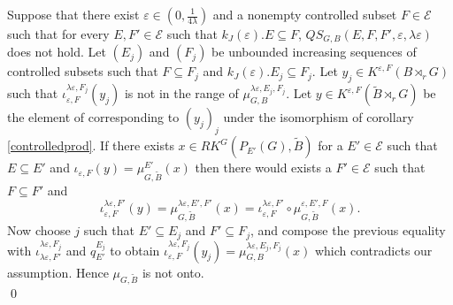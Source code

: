 \begin{dem}
Suppose that there exist $\varepsilon \in (0,\frac{1}{4\lambda})$ and a nonempty controlled subset $F\in\mathcal E$ such that for every $E,F'\in\mathcal E$ such that $k_J(\varepsilon). E \subseteq F$, $QS_{G,B}(E,F,F',\varepsilon,\lambda\varepsilon)$ does not hold. Let $(E_j)$ and $(F_j)$ be unbounded increasing sequences of controlled subsets such that $F\subseteq F_j$ and $k_J(\varepsilon).E_j\subseteq F_j$. Let $y_j\in K^{\varepsilon,F}(B\rtimes_r G)$ such that $\iota_{\varepsilon,F}^{\lambda\varepsilon,F_j}(y_j)$ is not in the range of $\mu_{G,B}^{\lambda\varepsilon, E_j , F_j}$. Let $y\in K^{\varepsilon,F}(\tilde B\rtimes_r G)$ be the element of corresponding to $(y_j)_j$ under the isomorphism of corollary \ref{controlledprod}. If there exists $x\in RK^G(P_{E'}(G),\tilde B)$ for a $E'\in\mathcal E$ such that $E\subseteq E'$ and $\iota_{\varepsilon,F}( y) =\mu_{G,\tilde B}^{E'}(x)$ then there would exists a $F'\in\mathcal E$ such that $F\subseteq F'$ and
\[\iota_{\varepsilon,F}^{\lambda\varepsilon, F'}( y) =\mu_{G,\tilde B}^{\lambda\varepsilon,E',F'}(x) = \iota_{\varepsilon,F}^{\lambda\varepsilon, F'}\circ\mu_{G,\tilde B}^{\varepsilon,E',F}(x).\]
Now choose $j$ such that $E'\subseteq E_j $ and $F'\subseteq F_j$, and compose the previous equality with $\iota_{\lambda\varepsilon,F'}^{\lambda\varepsilon,F_j}$ and $q_{E'}^{E_j}$ to obtain $\iota_{\varepsilon,F}^{\lambda\varepsilon,F_j}(y_j)=\mu_{G,B}^{\lambda\varepsilon , E_j,F_j}(x)$ which contradicts our assumption. Hence $\mu_{G,\tilde B}$ is not onto. \\
\qed
\end{dem}


